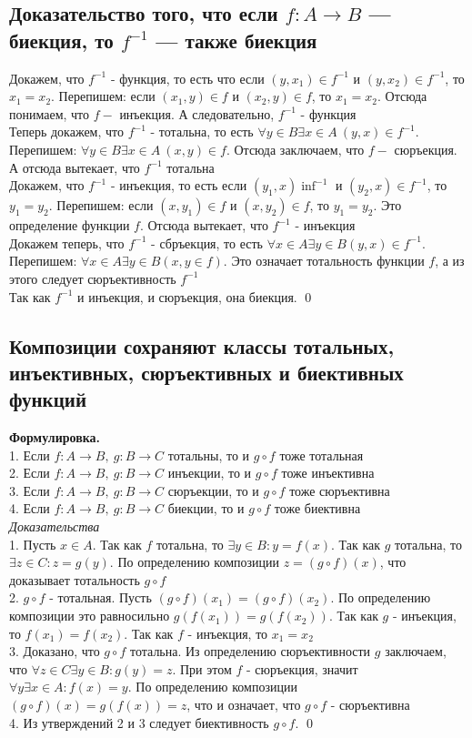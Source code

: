 \documentclass[a4paper]{article}
\begin{document}
\subsection{Доказательство того, что если $f: A\rightarrow B$ — биекция, то $f^{-1}$ — также биекция}
\label{sec:2.6}Докажем, что $f^{-1}$ - функция, то есть что если $(y, x_1)\in f^{-1}$ и $(y, x_2)\in f^{-1}$, то $x_1=x_2$. Перепишем: если $(x_1, y)\in f$ и $(x_2, y)\in f$, то $x_1=x_2$. Отсюда понимаем, что $f-$ инъекция. А следовательно, $f^{-1}$ - функция\\[2mm]
 Теперь докажем, что $f^{-1}$ - тотальна, то есть $\forall y\in B\exists x\in A\ (y,x)\in f^{-1}$. Перепишем: $\forall y\in B\exists x\in A\ (x,y)\in f$. Отсюда заключаем, что $f-$ сюръекция. А отсюда вытекает, что $f^{-1}$ тотальна\\[2mm]
 Докажем, что $f^{-1}$ - инъекция, то есть если $(y_1,x)\inf^{-1}$ и $(y_2,x)\in f^{-1}$, то $y_1=y_2$. Перепишем: если $(x,y_1)\in f$ и $(x,y_2)\in f$, то $y_1=y_2$. Это определение функции $f$. Отсюда вытекает, что $f^{-1}$ - инъекция\\[2mm]
 Докажем теперь, что $f^{-1}$ - сбръекция, то есть $\forall x\in A\exists y \in B (y,x)\in f^{-1}$. Перепишем: $\forall x\in A\exists y\in B (x,y\in f)$. Это означает тотальность функции $f$, а из этого следует сюръективность $f^{-1}$\\[2mm]
 Так как $f^{-1}$ и инъекция, и сюръекция, она биекция. \qed
\subsection{Композиции сохраняют классы тотальных, инъективных, сюръективных и биективных функций}
\label{sec:2.7}\textbf{Формулировка.}\\[2mm]
 1. Если $f: A\rightarrow B,\ g: B\rightarrow C$ тотальны, то и $g\circ f$ тоже тотальная\\[2mm] 
 2. Если $f: A\rightarrow B,\ g: B\rightarrow C$ инъекции, то и $g\circ f$ тоже инъективна\\[2mm]
 3. Если $f: A\rightarrow B,\ g: B\rightarrow C$ сюръекции, то и $g\circ f$ тоже сюръективна\\[2mm]
 4. Если $f: A\rightarrow B,\ g: B\rightarrow C$ биекции, то и $g\circ f$ тоже биективна\\[2mm]
\textit{Доказательства}\\[2mm]
 1. Пусть $x\in A$. Так как $f$ тотальна, то $\exists y\in B: y=f(x)$. Так как $g$ тотальна, то $\exists z\in C: z=g(y)$. По определению композиции $z=(g\circ f)(x)$, что доказывает тотальность $g\circ f$\\[2mm]
 2. $g\circ f$ - тотальная. Пусть $(g\circ f)(x_1)=(g\circ f)(x_2)$. По определению композиции это равносильно $g(f(x_1))=g(f(x_2))$. Так как $g$ - инъекция, то $f(x_1)=f(x_2)$. Так как $f$ - инъекция, то $x_1=x_2$\\[2mm]
 3. Доказано, что $g\circ f$ тотальна. Из определению сюръективности $g$ заключаем, что $\forall z\in C\exists y\in B: g(y)=z$. При этом $f$ - сюръекция, значит $\forall y\exists x\in A: f(x)=y$. По определению композиции $(g\circ f)(x)=g(f(x))=z$, что и означает, что $g\circ f$ - сюръективна\\[2mm]
 4. Из утверждений 2 и 3 следует биективность $g\circ f$. \qed
\end{document}
